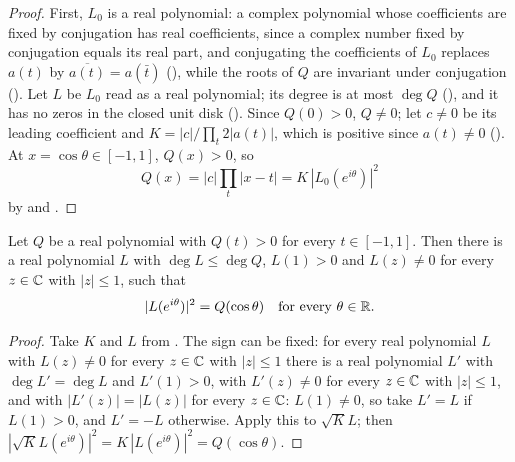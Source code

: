 \begin{proof}
\leanok
{}
First, $L_0$ is a real polynomial: a complex polynomial whose coefficients are fixed by
conjugation has real coefficients, since a complex number fixed by conjugation equals its real
part, and conjugating the coefficients of $L_0$ replaces $a(t)$ by $\overline{a(t)} = a(\bar t)$
(), while the roots of $Q$ are invariant under conjugation
(). Let $L$ be $L_0$ read as a real polynomial; its degree is at
most $\deg Q$ (), and it has no zeros in the closed unit disk
(). Since $Q(0) > 0$, $Q \neq 0$; let $c \neq 0$ be its
leading coefficient and $K = |c| / \prod_t 2 |a(t)|$, which is positive since $a(t) \neq 0$
(). At $x = \cos\theta \in [-1, 1]$, $Q(x) > 0$, so
\[
  Q(x) = |c| \prod_t |x - t| = K \, |L_0(e^{i\theta})|^2
\]
by  and .
\end{proof}

\begin{theorem}
\label{thm:daub-fejer-riesz}
\leanok
Let $Q$ be a real polynomial with $Q(t) > 0$ for every $t \in [-1, 1]$. Then there is a real
polynomial $L$ with $\deg L \leq \deg Q$, $L(1) > 0$ and $L(z) \neq 0$ for every $z \in \mathbb{C}$ with
$|z| \leq 1$, such that
\[
  |L(e^{i\theta})|^2 = Q(\cos\theta) \quad\text{for every } \theta \in \mathbb{R} .
\]
\end{theorem}

\begin{proof}
\leanok
{}
Take $K$ and $L$ from . The sign can be fixed: for every
real polynomial $L$ with $L(z) \neq 0$ for every $z \in \mathbb{C}$ with $|z| \leq 1$ there is a real
polynomial $L'$ with $\deg L' = \deg L$ and $L'(1) > 0$, with $L'(z) \neq 0$ for every $z \in \mathbb{C}$
with $|z| \leq 1$, and with $|L'(z)| = |L(z)|$ for every $z \in \mathbb{C}$: $L(1) \neq 0$, so take
$L' = L$ if $L(1) > 0$, and $L' = -L$ otherwise. Apply this to $\sqrt K L$; then
$|\sqrt K L(e^{i\theta})|^2 = K \, |L(e^{i\theta})|^2 = Q(\cos\theta)$.
\end{proof}

